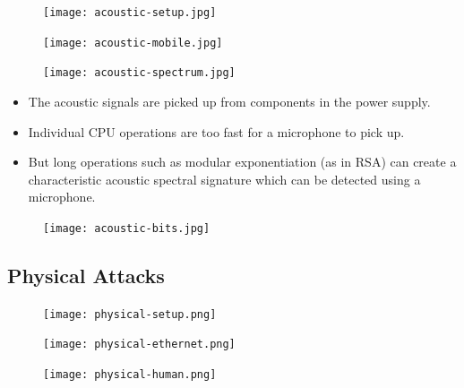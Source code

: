 \begin{frame}
  \begin{figure}
    \texttt{[image: acoustic-setup.jpg]}
  \end{figure}
  \begin{figure}
    \texttt{[image: acoustic-mobile.jpg]}
  \end{figure}
\end{frame}

\begin{frame}
  \begin{figure}
    \texttt{[image: acoustic-spectrum.jpg]}
  \end{figure}
  \begin{itemize}
    \item The acoustic signals are picked up from components in the power 
      supply.

    \item Individual CPU operations are too fast for a microphone to pick up.

    \item But long operations such as modular exponentiation (as in RSA) can 
      create a characteristic acoustic spectral signature which can be detected 
      using a microphone.
  \end{itemize}
\end{frame}

\begin{frame}
  \begin{figure}
    \texttt{[image: acoustic-bits.jpg]}
  \end{figure}
\end{frame}

\subsection{Physical Attacks}

\begin{frame}
  \begin{figure}
    \texttt{[image: physical-setup.png]}
  \end{figure}
\end{frame}

\begin{frame}
  \begin{figure}
    \texttt{[image: physical-ethernet.png]}
  \end{figure}
\end{frame}

\begin{frame}
  \begin{figure}
    \texttt{[image: physical-human.png]}
  \end{figure}
\end{frame}

